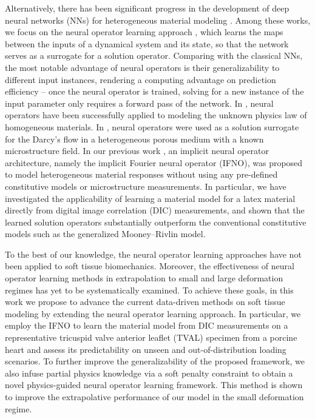 \documentclass[twocolumn,10pt]{asme2ej}
\renewcommand{\~}{\tilde}
\renewcommand{\-}{\bar}
\newcommand{\8}{\infty}
\numberwithin{equation}{section}
\begin{document}
Alternatively, there has been significant progress in the development of deep neural networks (NNs) for heterogeneous material modeling \cite{wang2018multiscale,he2020physics,tartakovsky2020physics,liu2019deep,yang2019derivation,garbrecht2021interpretable,you2022learning,lu2019deeponet,lu2021learning,li2020neural,li2020multipole,li2020fourier}. Among these works, we focus on the neural operator learning approach \cite{you2022learning,lu2019deeponet,lu2021learning,li2020neural,li2020multipole,li2020fourier}, which learns the maps between the inputs of a dynamical system and its state, so that the network serves as a surrogate for a solution operator. Comparing with the classical NNs, the most notable advantage of neural operators is their %
generalizability to different input instances,   
rendering a computing advantage on prediction efficiency -- once the neural operator is trained, solving for a new instance of the input parameter only requires a forward pass of the network. In \cite{yin2022simulating,goswami2022physics,yin2022interfacing}, neural operators have been successfully applied to modeling the unknown physics law of homogeneous materials. In \cite{li2020neural,li2020multipole,li2020fourier,lu2021comprehensive}, neural operators were used as a solution surrogate for the Darcy's flow in a heterogeneous porous medium with a known microstructure field. In our previous work \cite{you2022learning}, an implicit neural operator architecture, namely the implicit Fourier neural operator (IFNO), was proposed to model heterogeneous material responses without using any pre-defined constitutive models or microstructure measurements. In particular, we have investigated the applicability of learning a material model for a latex material directly from digital image correlation (DIC) measurements, and shown that the learned solution operators substantially outperform the conventional constitutive models such as the generalized Mooney--Rivlin model.

To the best of our knowledge, the neural operator learning approaches have not been applied to soft tissue biomechanics. Moreover, the effectiveness of neural operator learning methods in extrapolation to small and large deformation regimes has yet to be systematically examined. To achieve these goals, in this work we propose to advance the current data-driven methods on soft tissue modeling by extending the neural operator learning approach. In particular, we employ the IFNO to learn the material model from DIC measurements on a representative tricuspid valve anterior leaflet (TVAL) specimen from a porcine heart and assess its predictability on unseen and out-of-distribution loading scenarios. To further improve the generalizability of the proposed framework, we also infuse partial physics knowledge via a soft penalty constraint to obtain a novel physics-guided neural operator learning framework. This method is shown to improve the extrapolative performance of our model in the small deformation regime.
\end{document}
